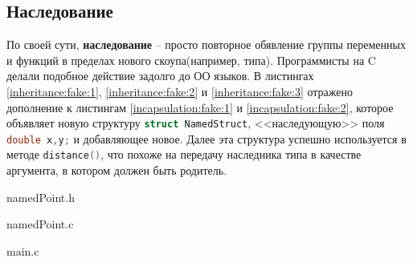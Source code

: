 \subsection{Наследование}
\label{sec:inheritance}

По своей сути, \textbf{наследование} -- просто повторное обявление группы переменных и функций в пределах нового скоупа(например, типа). Программисты на C делали подобное действие задолго до ОО языков. В листингах \ref{inheritance:fake:1}, \ref{inheritance:fake:2} и \ref{inheritance:fake:3} отражено дополнение к листингам \ref{incapsulation:fake:1} и \ref{incapsulation:fake:2}, которое объявляет новую структуру \lstinline[language=C]{struct NamedStruct}, <<наследующую>> поля \lstinline[language=C]{double x,y;} и добавляющее новое. Далее эта структура успешно используется в методе \lstinline[language=C]{distance()}, что похоже на передачу наследника типа в качестве аргумента, в котором должен быть родитель.

\begin{code}
	
   \caption{namedPoint.h}
   \label{inheritance:fake:1}
\end{code}

\begin{code}
	
   \caption{namedPoint.c}
   \label{inheritance:fake:2}
\end{code}

\begin{code}
	
   \caption{main.c}
   \label{inheritance:fake:2}
\end{code}
